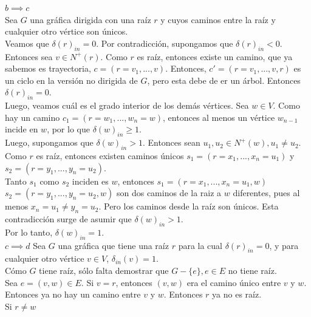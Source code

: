\documentclass[12pt,a4paper]{report}
\begin{document}
\begin{enumerate}
{			$b \implies c$\\
			Sea $G$ una gráfica dirigida con una raíz $r$ y cuyos caminos entre la raíz y
			cualquier otro vértice son únicos.\\
			Veamos que $\delta(r)_{in} = 0$. Por contradicción, supongamos que
			$\delta(r)_{in} < 0$. Entonces sea $v \in N^+(r)$. Como $r$ es raíz,
			entonces existe un camino, que ya sabemos es trayectoria,
			$c = (r = v_1, ..., v)$. Entonces, $c' = (r = v_1, ..., v, r)$ es un
			ciclo en la versión no dirigida de $G$, pero esta debe de er un árbol.
			Entonces $\delta(r)_{in} = 0$.\\
			Luego, veamos cuál es el grado interior de los demás vértices.
			Sea $w \in V$. Como hay un camino $c_1 = (r = w_1, ..., w_n = w)$,
			entonces al menos un vértice $w_{n-1}$ incide en $w$, por lo que
			$\delta(w)_{in} \geq 1$.\\
			Luego, supongamos que $\delta(w)_{in} > 1$. Entonces sean
			 $u_1, u_2 \in N^+(w), u_1 \neq u_2$.\\
			Como $r$ es raíz, entonces existen caminos únicos $s_1 = (r = x_1, ..., x_n = u_1)$
			y $s_2 = (r = y_1, ..., y_n = u_2)$.\\
			Tanto $s_1$ como  $s_2$ inciden es $w$, entonces
			$s_1 = (r = x_1, ..., x_n = u_1, w)$ $s_2 = (r = y_1, ..., y_n = u_2, w)$
			son dos caminos de la raiz a $w$ diferentes, pues al menos $x_n = u_1 \neq y_n = u_2$.
			Pero los caminos desde la raíz son únicos. Esta contradicción surge de
			asumir que $\delta(w)_{in} > 1$.\\
			Por lo tanto, $\delta(w)_{in} = 1$.\\

			$c \implies d$
			Sea $G$ una gráfica que tiene una raíz $r$ para la cual $\delta(r)_{in} = 0$,
			y para cualquier otro vértice  $v \in V$, $\delta_{in}(v) = 1$.\\
			Cómo $G$ tiene raíz, sólo falta demostrar que $G-\{e\}, e \in E$ no tiene
			raíz.\\
			Sea $e = (v, w) \in E$. Si $v = r$, entonces $(v, w)$ era el camino único
			entre $v$ y $w$. Entonces ya no hay un camino entre $v$ y $w$. Entonces
			$r$ ya no es raíz.\\
			Si $r \neq w$
		}
	\end{enumerate}
\end{document}
